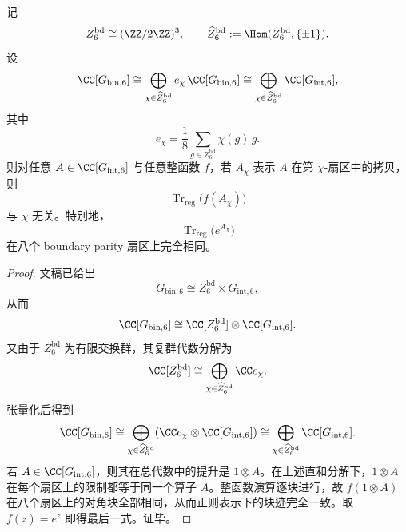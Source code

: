 \begin{theorem}\label{thm:conclusion-window6-boundary-eightsector-heattrace-equipartition}
记
\[
Z_6^{\mathrm{bd}}\cong (\ZZ/2\ZZ)^3,
\qquad
\widehat Z_6^{\mathrm{bd}}:=\Hom(Z_6^{\mathrm{bd}},\{\pm 1\}).
\]
设
\[
\CC[G_{\mathrm{bin},6}]
\cong
\bigoplus_{\chi\in\widehat Z_6^{\mathrm{bd}}}
e_{\chi}\,\CC[G_{\mathrm{bin},6}]
\cong
\bigoplus_{\chi\in\widehat Z_6^{\mathrm{bd}}}\CC[G_{\mathrm{int},6}],
\]
其中
\[
e_{\chi}
=
\frac{1}{8}\sum_{g\in Z_6^{\mathrm{bd}}}\chi(g)\,g.
\]
则对任意 \(A\in \CC[G_{\mathrm{int},6}]\) 与任意整函数 \(f\)，若 \(A_{\chi}\) 表示 \(A\) 在第 \(\chi\)-扇区中的拷贝，则
\[
\operatorname{Tr}_{\mathrm{reg}}\!\bigl(f(A_{\chi})\bigr)
\]
与 \(\chi\) 无关。特别地，
\[
\operatorname{Tr}_{\mathrm{reg}}\!\bigl(e^{A_{\chi}}\bigr)
\]
在八个 boundary parity 扇区上完全相同。
\end{theorem}
\begin{proof}
文稿已给出
\[
G_{\mathrm{bin},6}\cong Z_6^{\mathrm{bd}}\times G_{\mathrm{int},6},
\]
从而
\[
\CC[G_{\mathrm{bin},6}]
\cong
\CC[Z_6^{\mathrm{bd}}]\otimes \CC[G_{\mathrm{int},6}].
\]
又由于 \(Z_6^{\mathrm{bd}}\) 为有限交换群，其复群代数分解为
\[
\CC[Z_6^{\mathrm{bd}}]\cong \bigoplus_{\chi\in\widehat Z_6^{\mathrm{bd}}}\CC e_{\chi}.
\]
张量化后得到
\[
\CC[G_{\mathrm{bin},6}]
\cong
\bigoplus_{\chi\in\widehat Z_6^{\mathrm{bd}}}
(\CC e_{\chi}\otimes \CC[G_{\mathrm{int},6}])
\cong
\bigoplus_{\chi\in\widehat Z_6^{\mathrm{bd}}}\CC[G_{\mathrm{int},6}].
\]
若 \(A\in \CC[G_{\mathrm{int},6}]\)，则其在总代数中的提升是 \(1\otimes A\)。在上述直和分解下，\(1\otimes A\) 在每个扇区上的限制都等于同一个算子 \(A\)。整函数演算逐块进行，故 \(f(1\otimes A)\) 在八个扇区上的对角块全部相同，从而正则表示下的块迹完全一致。取 \(f(z)=e^z\) 即得最后一式。证毕。
\end{proof}


